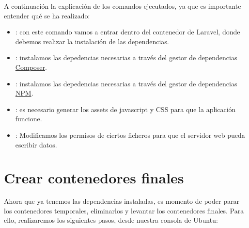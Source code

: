 
A continuación la explicación de los comandos ejecutados, ya que es importante entender qué se ha realizado:

\begin{itemize}
    \item {} : con este comando vamos a entrar dentro del contenedor de Laravel, donde debemos realizar la instalación de las dependencias.

    \item {} : instalamos las depedencias necesarias a través del gestor de dependencias \href{https://getcomposer.org/}{Composer}.

    \item {} : instalamos las depedencias necesarias a través del gestor de dependencias \href{https://www.npmjs.com/}{NPM}.

    \item {} : es necesario generar los assets de javascript y CSS para que la aplicación funcione.

    \item {} : Modificamos los permisos de ciertos ficheros para que el servidor web pueda escribir datos.
\end{itemize}


\section{Crear contenedores finales}

Ahora que ya tenemos las dependencias instaladas, es momento de poder parar los contenedores temporales, eliminarlos y levantar los contenedores finales. Para ello, realizaremos los siguientes pasos, desde nuestra consola de Ubuntu:

